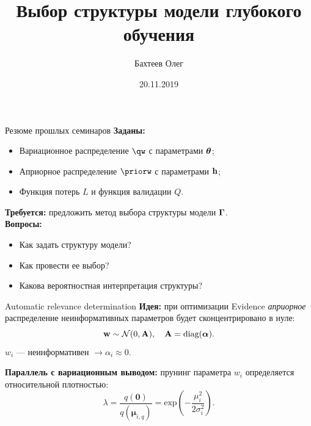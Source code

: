 \documentclass[10pt,pdf,utf8,russian,aspectratio=169]{beamer}
\title[Структура]{Выбор структуры модели глубокого обучения}
\author{Бахтеев Олег}
\institute{МФТИ}
\date{20.11.2019}
\begin{document}

\begin{frame}
  \titlepage
\end{frame}

\begin{frame}{Резюме прошлых семинаров}
\textbf{Заданы: }
\begin{itemize}
\item Вариационное распределение $\qw$ с параметрами $\boldsymbol{\theta}$;
\item Априорное распределение $\priorw$ с параметрами $\mathbf{h}$;
\item Функция потерь $L$ и функция валидации $Q$.
\end{itemize}
\vspace{0.2cm}
\textbf{Требуется:} предложить метод выбора структуры модели $\boldsymbol{\Gamma}$.\\
\vspace{0.2cm}
\textbf{Вопросы:}
\begin{itemize}
\item Как задать структуру модели?
\item Как провести ее выбор?
\item Какова вероятностная интерпретация структуры?
\end{itemize}

\end{frame}

\begin{frame}{Automatic relevance determination}
\textbf{Идея:} при оптимизации Evidence \textit{априорное} распределение неинформативных параметров будет сконцентрировано в нуле:
\[
    \mathbf{w} \sim \mathcal{N}(0, \mathbf{A}), \quad \mathbf{A}=\text{diag}(\boldsymbol{\alpha}).
\]
$w_i$ --- неинформативен $\rightarrow \alpha_i \approx 0.$
\vspace{1cm}

\textbf{Параллель с вариационным выводом:}
прунинг параметра ${w}_i$ определяется относительной плотностью:
\[
	\lambda = \frac{q(\mathbf{0})}{q(\boldsymbol{\mu}_{i,q})}  = \text{exp}(-\frac{\mu_i^2}{2\sigma_i^2}).
\]
\end{frame}
\end{document}
